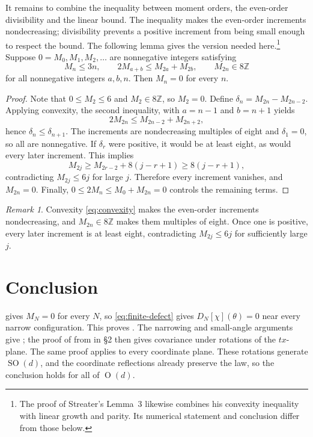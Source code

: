 \documentclass[11pt, letterpaper, reqno]{amsart}
\theoremstyle{definition}
\newenvironment{lemma}
{\pushQED{\qed}\renewcommand{\qedsymbol}{$\blacksquare$}\lemmax}
{\popQED\endlemmax}
\theoremstyle{remark}
\newtheorem*{remark*}{Remark}
\newcommand{\bbZ}{\mathbb{Z}}
\begin{document}
It remains to combine the inequality between moment orders, the
even-order divisibility and the linear bound. The inequality makes
the even-order increments nondecreasing; divisibility prevents a
positive increment from being small enough to respect the bound.
The following lemma gives the version needed here.\footnote{The proof
of Streater's Lemma~3 \cite[p.~114]{Streater} likewise combines his
convexity inequality with linear growth and parity. Its numerical
statement and conclusion differ from those below.}
\begin{lemma}\label{lem:integer}
Suppose $0=M_0,M_1,M_2,\dots$ are nonnegative integers satisfying
\begin{equation}
 M_n\leq3n,\qquad2M_{a+b}\leq M_{2a}+M_{2b},\qquad
 M_{2n}\in8\bbZ
\end{equation}
for all nonnegative integers $a,b,n$. Then $M_n=0$ for every $n$.
\end{lemma}
\begin{proof}
Note that $0\leq M_2\leq6$ and $M_2\in8\bbZ$, so $M_2=0$.
Define $\delta_n=M_{2n}-M_{2n-2}$. Applying convexity, the second inequality, with
$a=n-1$ and $b=n+1$ yields
\begin{equation}
 2M_{2n}\leq M_{2n-2}+M_{2n+2},
\end{equation}
hence $\delta_n\leq\delta_{n+1}$. The increments are nondecreasing
multiples of eight and $\delta_1=0$, so all are nonnegative. If
$\delta_r$ were positive, it would be at least eight, as would every
later increment. This implies
\begin{equation}
 M_{2j}\geq M_{2r-2}+8(j-r+1)\geq8(j-r+1),
\end{equation}
contradicting $M_{2j}\leq6j$ for large $j$. Therefore every increment
vanishes, and $M_{2n}=0$. Finally,
$0\leq2M_n\leq M_0+M_{2n}=0$ controls the remaining terms.
\end{proof}

\begin{remark*}
Convexity \eqref{eq:convexity} makes the even-order increments
nondecreasing, and $M_{2n}\in8\bbZ$ makes them multiples of eight.
Once one is positive, every later increment is at least eight,
contradicting $M_{2j}\leq6j$ for sufficiently large $j$.
\end{remark*}

\section{Conclusion}

 gives $M_N=0$ for every $N$, so
\eqref{eq:finite-defect} gives $D_N[\chi](\theta)=0$ near every narrow
configuration. This proves . The narrowing and small-angle
arguments give ; the proof of  from
 in \S2 then gives covariance under rotations of the
$tx$-plane.
The same proof applies to every coordinate plane. These rotations
generate $\operatorname{SO}(d)$, and the coordinate reflections
already preserve the law, so the conclusion holds for all of
$\operatorname{O}(d)$.
\end{document}
